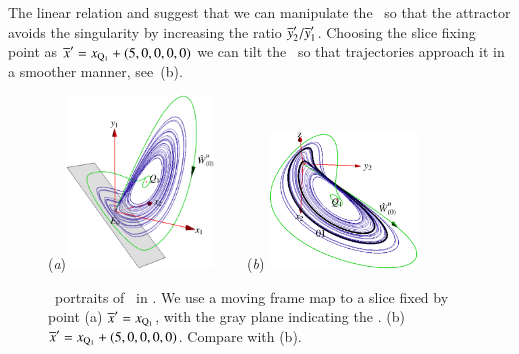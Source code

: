 \documentclass[preprint,number,sort&compress]{elsarticle}
\begin{document}
The linear relation  and
 suggest that we can manipulate the
\sset\ so that the attractor avoids the singularity by
increasing the ratio ${\overline{y}'_{2}}/{\overline{y}'_{1}}$.
Choosing the slice fixing point as
${\overline{x}'}=x_{\mathrm{Q}_{1}}+(5,0,0,0,0)$
we can tilt the \sset\ so that trajectories approach it in a
smoother manner, see \,(b).
\begin{figure}[ht]
\begin{center}
  (\textit{a})\includegraphics[width=0.35\textwidth,clip=true]{CLEmfReqb234}
~~~~(\textit{b})%
\includegraphics[width=0.35\textwidth,clip=true]{CLEmfAdHoc245}
\end{center}
\caption{
\Statesp\ portraits of \cLf\ in \reducedsp. We use a
moving frame map to a slice fixed by point
(a) ${\overline{x}'}  = x_{\mathrm{Q}_{1}}$, with
the gray plane indicating the \sset.
(b) ${\overline{x}'}  = x_{\mathrm{Q}_{1}}+(5,0,0,0,0)$. Compare with (b).
    }\label{fig:CLEmfsset}
\end{figure}
%

\end{document}
